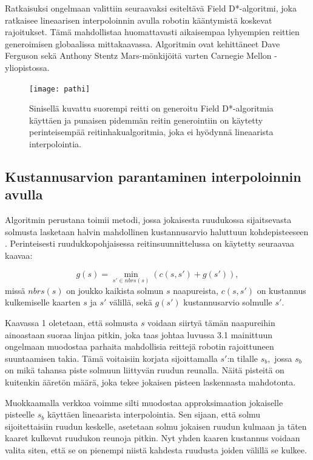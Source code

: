 \documentclass[finnish]{tktltiki2}
\theoremstyle{definition}
\theoremstyle{remark}
\begin{document}
Ratkaisuksi ongelmaan valittiin seuraavaksi esiteltävä Field D*-algoritmi, joka ratkaisee lineaarisen interpoloinnin avulla robotin kääntymistä koskevat rajoitukset. Tämä mahdollistaa huomattavasti aikaisempaa lyhyempien reittien generoimisen globaalissa mittakaavassa. Algoritmin ovat kehittäneet Dave Ferguson sekä Anthony Stentz Mars-mönkijöitä varten Carnegie Mellon -yliopistossa. \cite{ferguson2006using}

\begin{figure}[H]
	\centering
		\texttt{[image: pathi]}
	\caption{Sinisellä kuvattu suorempi reitti on generoitu Field D*-algoritmia käyttäen ja punaisen pidemmän reitin generointiin on käytetty perinteisempää reitinhakualgoritmia, joka ei hyödynnä lineaarista interpolointia\cite{marsjuttuja}.}
\end{figure}


\subsection{Kustannusarvion parantaminen interpoloinnin avulla}
Algoritmin perustana toimii metodi, jossa jokaisesta ruudukossa sijaitsevasta solmusta lasketaan halvin mahdollinen kustannusarvio haluttuun kohdepisteeseen \cite{ferguson2007field}. Perinteisesti ruudukkopohjaisessa reitinsuunnittelussa on käytetty seuraavaa kaavaa:

\begin{equation}
	g(s) = \min_{s'\in nbrs(s)} (c(s, s') +g(s')),
\end{equation}
missä \(nbrs(s)\) on joukko kaikista solmun \(s\) naapureista, \(c(s,s')\) on kustannus kulkemiselle kaarten \(s\) ja \(s'\) välillä, sekä \(g(s')\) kustannusarvio solmulle \(s'\).

Kaavassa 1 oletetaan, että solmusta \(s\) voidaan siirtyä tämän naapureihin ainoastaan suoraa linjaa pitkin, joka taas johtaa luvussa 3.1 mainittuun ongelmaan muodostaa parhaita mahdollisia reittejä robotin rajoittuneen suuntaamisen takia. Tämä voitaisiin korjata sijoittamalla \(s'\):n tilalle \(s_b,\) jossa \(s_b\) on mikä tahansa piste solmuun liittyvän ruudun reunalla. Näitä pisteitä on kuitenkin ääretön määrä, joka tekee jokaisen pisteen laskennasta mahdotonta.

Muokkaamalla verkkoa voimme silti muodostaa approksimaation jokaiselle pisteelle \(s_b\) käyttäen lineaarista interpolointia. Sen sijaan, että solmu sijoitettaisiin ruudun keskelle, asetetaan solmu jokaisen ruudun kulmaan ja täten kaaret kulkevat ruudukon reunoja pitkin. Nyt yhden kaaren kustannus voidaan valita siten, että se on pienempi niistä kahdesta ruudusta joiden välillä se kulkee.
\end{document}
